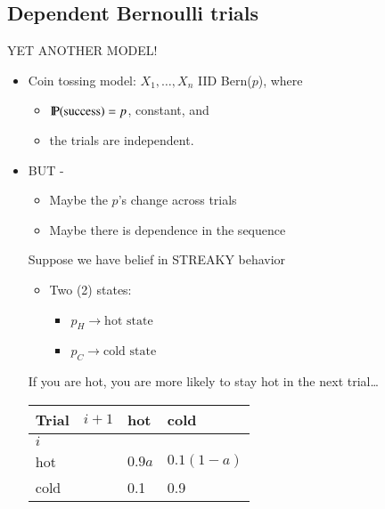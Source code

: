 \documentclass[captions=tableheading]{scrbook}
\begin{document}
\subsection{Dependent Bernoulli trials}
\label{sec-1_2_4}

YET ANOTHER MODEL!


\begin{itemize}
\item Coin tossing model: \(X_{1},\ldots, X_{n}\) IID Bern($p$), where
\begin{itemize}
\item $\P(\mbox{success}) = p$, constant, and
\item the trials are independent.
\end{itemize}
\end{itemize}
\begin{itemize}

\item BUT -\\
\label{sec-1_2_4_1}%
\begin{itemize}
\item Maybe the $p$'s change across trials
\item Maybe there is dependence in the sequence
\end{itemize}

Suppose we have belief in STREAKY behavior

\begin{itemize}
\item Two (2) states:
\begin{itemize}
\item $p_{H} \to \mbox{hot state}$
\item $p_{C} \to \mbox{cold state}$
\end{itemize}
\end{itemize}

If you are hot, you are more likely to stay hot in the next trial\ldots{}


\begin{center}
\begin{tabular}{llll}
 Trial  &  $i + 1$  &  hot     &  cold          \\
\hline
 $i$    &           &          &                \\
 hot    &           &  $0.9a$  &  $0.1(1 - a)$  \\
 cold   &           &  0.1     &  0.9           \\
\end{tabular}
\end{center}





\end{itemize}
\end{document}
